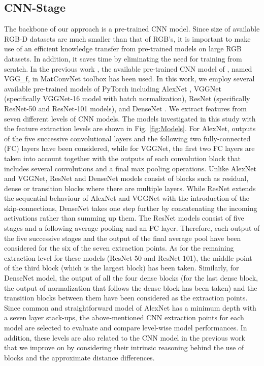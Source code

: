 \documentclass[10pt,journal,compsoc]{IEEEtran}
\begin{document}
\subsection{CNN-Stage}
The backbone of our approach is a pre-trained CNN model. Since size of available RGB-D datasets are much smaller than that of RGB's, it is important to make use of an efficient knowledge transfer from pre-trained models on large RGB datasets. In addition, it saves time by eliminating the need for training from scratch. In the previous work \cite{Caglayan_ECCVW_2018}, the available pre-trained CNN model of \cite{Chatfield_BMVC_2014}, named VGG\_f, in MatConvNet toolbox \cite{Vedaldi_Matconvnet_ICM_2015} has been used. In this work, we employ several available pre-trained models of PyTorch including AlexNet \cite{Krizhevsky_NIPS_2012}, VGGNet \cite{Simonyan_ICLR_2015} (specifically VGGNet-16 model with batch normalization), ResNet \cite{He_CVPR_2016} (specifically ResNet-50 and ResNet-101 models), and DenseNet \cite{Huang_CVPR_2017}. We extract features from seven different levels of CNN models. The models investigated in this study with the feature extraction levels are shown in Fig. \ref{fig:Models}. For AlexNet, outputs of the five successive convolutional layers and the following two fully-connected (FC) layers have been considered, while for VGGNet, the first two FC layers  are taken into account together with the outputs of each convolution block that includes several convolutions and a final max pooling operations. Unlike AlexNet and VGGNet, ResNet and DenseNet models consist of blocks such as residual, dense or transition blocks where there are multiple layers. While ResNet extends the sequential behaviour of AlexNet and VGGNet with the introduction of the skip-connections, DenseNet takes one step further by concatenating the incoming activations rather than summing up them. The ResNet models consist of five stages and a following average pooling and an FC layer. Therefore, each output of the five successive stages and the output of the final average pool have been considered for the six of the seven extraction points. As for the remaining extraction level for these models (ResNet-50 and ResNet-101), the middle point of the third block (which is the largest block) has been taken. Similarly, for DenseNet model, the output of all the four dense blocks (for the last dense block, the output of normalization that follows the dense block has been taken) and the transition blocks between them have been considered as the extraction points. Since common and straightforward model of AlexNet has a minimum depth with a seven layer stack-ups, the above-mentioned CNN extraction points for each model are selected to evaluate and compare level-wise model performances. In addition, these levels are also related to the CNN model in the previous work \cite{Caglayan_ECCVW_2018} that we improve on by considering their intrinsic reasoning behind the use of blocks and the approximate distance differences.
\end{document}
